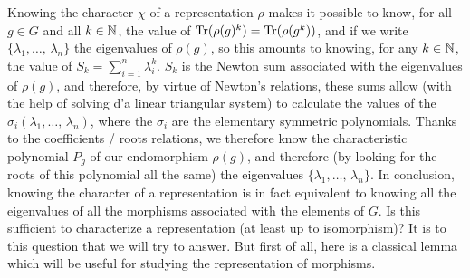   Knowing the character $ \chi $ of a representation $ \rho $ makes it possible to know, for all $ g \in G $ and all $ k \in \mathbb{N} $, the value of $ \operatorname{Tr} (\rho (g)^k) = \operatorname{Tr} (\rho (g^k)) $, and if we write $ \{\lambda_1, \ldots, \, \lambda_n\} $ the eigenvalues of $ \rho (g) $, so this amounts to knowing, for any $ k \in \mathbb{N} $, the value of $ S_k = \sum_{i = 1}^n{\lambda_i^k } $. $ S_k $ is the  Newton sum associated with the eigenvalues of $ \rho (g) $, and therefore, by virtue of Newton's relations, these sums allow (with the help of solving d'a linear triangular system) to calculate the values of the $ \sigma_i (\lambda_1, \ldots, \, \lambda_n) $, where the $ \sigma_i $ are the elementary symmetric polynomials. Thanks to the coefficients / roots relations, we therefore know the characteristic polynomial $ P_g $ of our endomorphism $ \rho (g) $, and therefore (by looking for the roots of this polynomial all the same) the eigenvalues $ \{\lambda_1 , \ldots, \, \lambda_n\} $. In conclusion, knowing the character of a representation is in fact equivalent to knowing all the eigenvalues of all the morphisms associated with the elements of $G$. Is this sufficient to characterize a representation (at least up to isomorphism)? It is to this question that we will try to answer. But first of all, here is a classical lemma which will be useful for studying the representation of morphisms.
 
